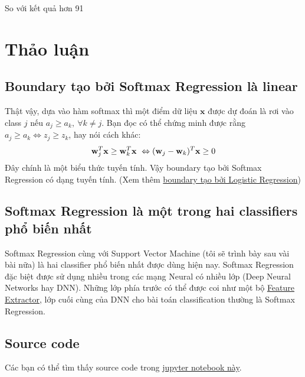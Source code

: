 So với kết quả hơn 91%
 
 
\section{Thảo luận }
 
\subsection{Boundary tạo bởi Softmax Regression là linear}
Thật vậy, dựa vào hàm softmax thì một điểm dữ liệu $\mathbf{x}$ được dự đoán là rơi vào class $j$ nếu $a_{j} \geq a_{k}, ~\forall k \neq j$. Bạn đọc có thể chứng minh được rằng $a_{j} \geq a_{k} \Leftrightarrow z_{j} \geq z_{k}$, hay nói cách khác:  
\begin{equation*} 
\mathbf{w}_j^T \mathbf{x} \geq \mathbf{w}_k^T\mathbf{x}\\\ 
\Leftrightarrow (\mathbf{w}_j - \mathbf{w}_k)^T\mathbf{x} \geq 0 
\end{equation*} 
Đây chính là một biểu thức tuyến tính. Vậy boundary tạo bởi Softmax Regression có dạng tuyến tính. (Xem thêm \href{http://machinelearningcoban.com/2017/01/27/logisticregression/#boundary-tao-boi-logistic-regression-co-dang-tuyen-tinh}{boundary tạo bởi Logistic Regression}) 
 
 
\subsection{Softmax Regression là một trong hai classifiers phổ biến nhất}
Softmax Regression cùng với Support Vector Machine (tôi sẽ trình bày sau vài bài nữa) là hai classifier phổ biến nhất được dùng hiện nay. Softmax Regression đặc biệt được sử dụng nhiều trong các mạng Neural có nhiều lớp (Deep Neural Networks hay DNN). Những lớp phía trước có thể được coi như một bộ \href{http://machinelearningcoban.com/general/2017/02/06/featureengineering/#feature-extractor}{Feature Extractor}, lớp cuối cùng của DNN cho bài toán classification thường là Softmax Regression.  
 
 
\subsection{Source code }
 
Các bạn có thể tìm thấy source code trong \href{https://github.com/tiepvupsu/tiepvupsu.github.io/blob/master/assets/13_softmax/Softmax%20Regression.ipynb}{jupyter notebook này}. 
 
